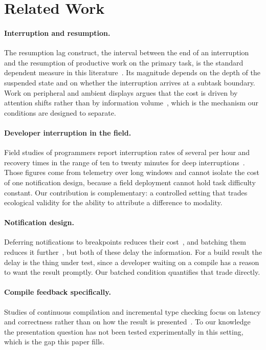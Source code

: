 \section{Related Work}
\label{sec:related}

\paragraph*{Interruption and resumption.}
The resumption lag construct, the interval between the end of an interruption
and the resumption of productive work on the primary task, is the standard
dependent measure in this
literature~\citep{brandt2011resumption,ferreiro2014fragmentation}. Its
magnitude depends on the depth of the suspended state and on whether the
interruption arrives at a subtask boundary. Work on peripheral and ambient
displays argues that the cost is driven by attention shifts rather than by
information volume~\citep{okonjo2016peripheral}, which is the mechanism our
conditions are designed to separate.

\paragraph*{Developer interruption in the field.}
Field studies of programmers report interruption rates of several per hour and
recovery times in the range of ten to twenty minutes for deep
interruptions~\citep{ferreiro2014fragmentation,steinbach2019telemetry}. Those
figures come from telemetry over long windows and cannot isolate the cost of
one notification design, because a field deployment cannot hold task difficulty
constant. Our contribution is complementary: a controlled setting that trades
ecological validity for the ability to attribute a difference to modality.

\paragraph*{Notification design.}
Deferring notifications to breakpoints reduces their
cost~\citep{ravichandran2018deferral}, and batching them reduces it
further~\citep{nkemdirim2020batching}, but both of these delay the information.
For a build result the delay is the thing under test, since a developer waiting
on a compile has a reason to want the result promptly. Our batched condition
quantifies that trade directly.

\paragraph*{Compile feedback specifically.}
Studies of continuous compilation and incremental type checking focus on
latency and correctness rather than on how the result is
presented~\citep{lindqvist2017continuous}. To our knowledge the presentation
question has not been tested experimentally in this setting, which is the gap
this paper fills.
